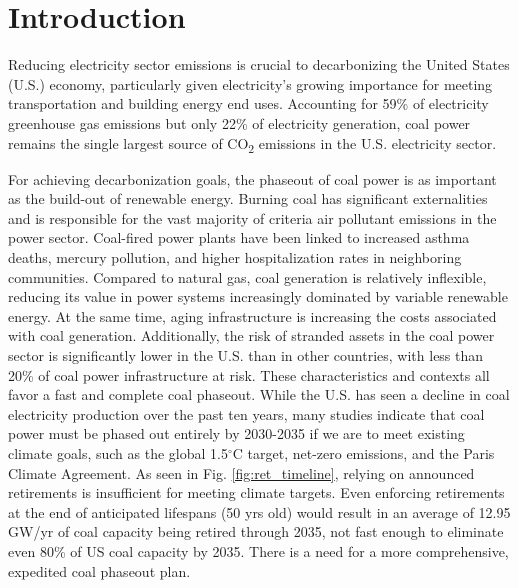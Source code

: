\setlength{\parindent}{20pt}


\section{Introduction}



Reducing electricity sector emissions is crucial to decarbonizing the United States (U.S.) economy, particularly given electricity's growing importance for meeting transportation and building energy end uses.
Accounting for 59\% of electricity greenhouse gas emissions but only 22\% of electricity generation, coal power remains the single largest source of CO\textsubscript{2} emissions in the U.S. electricity sector.

For achieving decarbonization goals, the phaseout of coal power is as important as the build-out of renewable energy.
Burning coal has significant externalities and is responsible for the vast majority of criteria air pollutant emissions in the power sector.
Coal-fired power plants have been linked to increased asthma deaths, mercury pollution, and higher hospitalization rates in neighboring communities.
Compared to natural gas, coal generation is relatively inflexible, reducing its value in power systems increasingly dominated by variable renewable energy. At the same time, aging infrastructure is increasing the costs associated with coal generation.
Additionally, the risk of stranded assets in the coal power sector is significantly lower in the U.S. than in other countries, with less than 20\% of coal power infrastructure at risk.
These characteristics and contexts all favor a fast and complete coal phaseout. 
While the U.S. has seen a decline in coal electricity production over the past ten years, many studies indicate that coal power must be phased out entirely by 2030-2035 if we are to meet existing climate goals, such as the global 1.5$^\circ$C target, 
net-zero emissions, 
and the Paris Climate Agreement. As seen in Fig. \ref{fig:ret_timeline}, relying on announced retirements is insufficient for meeting climate targets.
Even enforcing retirements at the end of anticipated lifespans (50 yrs old) would result in an average of 12.95 GW/yr of coal capacity being retired through 2035,
not fast enough to eliminate even 80\% of US coal capacity by 2035. There is a need for a more comprehensive, expedited coal phaseout plan.

